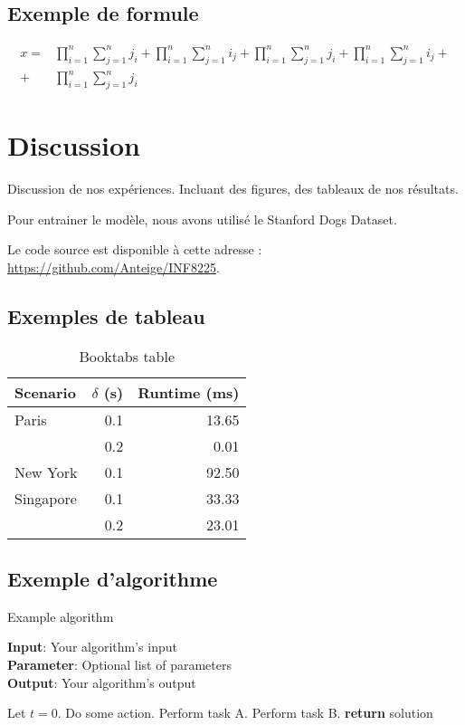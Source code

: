 \documentclass{article}
\begin{document}
\subsection{Exemple de formule}

\begin{align}
    x =& \prod_{i=1}^n \sum_{j=1}^n j_i + \prod_{i=1}^n \sum_{j=1}^n i_j + \prod_{i=1}^n \sum_{j=1}^n j_i + \prod_{i=1}^n \sum_{j=1}^n i_j + \nonumber\\
    + & \prod_{i=1}^n \sum_{j=1}^n j_i
\end{align}

\section{Discussion}

Discussion de nos expériences. Incluant des figures, des tableaux de nos résultats.

Pour entrainer le modèle, nous avons utilisé le Stanford Dogs Dataset. ~\cite{KhoslaYaoJayadevaprakashFeiFei_FGVC2011}

Le code source est disponible à cette adresse : \url{https://github.com/Anteige/INF8225}.

\subsection{Exemples de tableau}

\begin{table}
\centering
\begin{tabular}{lrr}  
\toprule
Scenario  & $\delta$ (s) & Runtime (ms) \\
\midrule
Paris       & 0.1  & 13.65      \\
            & 0.2  & 0.01       \\
New York    & 0.1  & 92.50      \\
Singapore   & 0.1  & 33.33      \\
            & 0.2  & 23.01      \\
\bottomrule
\end{tabular}
\caption{Booktabs table}
\label{tab:booktabs}
\end{table}

\subsection{Exemple d'algorithme}

\begin{algorithm}[tb]
\caption{Example algorithm}
\label{alg:algorithm}
\textbf{Input}: Your algorithm's input\\
\textbf{Parameter}: Optional list of parameters\\
\textbf{Output}: Your algorithm's output
\begin{algorithmic}[1] %
\STATE Let $t=0$.
\STATE Do some action.
\STATE Perform task A.
\ELSE
\STATE Perform task B.
\ENDIF
\ENDWHILE
\STATE \textbf{return} solution
\end{algorithmic}
\end{algorithm}
\end{document}
